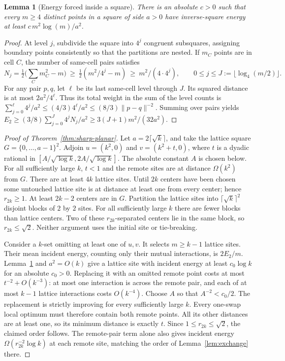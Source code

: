 \documentclass[a4paper,12pt]{article}
\newtheorem{lemma}[theorem]{Lemma}
\numberwithin{equation}{section}
\begin{document}
\begin{lemma}[Energy forced inside a square]\label{lem:square-bulk}
There is an absolute $c>0$ such that every $m\ge4$ distinct points in a square of side
$a>0$ have inverse-square energy at least $c\,m^2\log(m)/a^2$.
\end{lemma}
\begin{proof}
At level $j$, subdivide the square into $4^j$ congruent subsquares, assigning boundary points
consistently so that the partitions are nested. If $m_C$ points are in cell $C$, the number of
same-cell pairs satisfies
\[
 N_j=\tfrac12\bigl(\textstyle\sum_C m_C^2-m\bigr)
 \ \ge\ \tfrac12(m^2/4^j-m)
 \ \ge\ m^2/(4\cdot4^j),\qquad 0\le j\le J:=\lfloor\log_4(m/2)\rfloor .
\]
For any pair $p,q$, let $\ell$ be its last same-cell level through $J$. Its squared distance is
at most $2a^2/4^\ell$. Thus its total weight in the sum of the level counts is
$\sum_{j=0}^{\ell}4^j/a^2\le(4/3)4^\ell/a^2\le(8/3)\|p-q\|^{-2}$. Summing over pairs
yields $E_2\ge(3/8)\sum_{j=0}^J4^jN_j/a^2\ge3(J+1)m^2/(32a^2)$.
\end{proof}

\begin{proof}[Proof of Theorem~\ref{thm:sharp-planar}]
Let $a=2\lceil\sqrt{k}\rceil$, and take the lattice square $G=\{0,\ldots,a-1\}^2$.
Adjoin $u=(k^2,0)$ and $v=(k^2+t,0)$, where $t$ is a dyadic rational in
$[A/\sqrt{\log k},2A/\sqrt{\log k}]$. The absolute constant $A$ is chosen below. For all
sufficiently large $k$, $t<1$ and the remote sites are at distance $\Omega(k^2)$ from $G$.
There are at least $4k$ lattice sites. Until $2k$ centers have been chosen some untouched lattice
site is at distance at least one from every center; hence $r_{2k}\ge1$. At least $2k-2$ centers
are in $G$. Partition the lattice sites into $\lceil\sqrt{k}\rceil^2$ disjoint blocks of
$2$ by $2$ sites. For all sufficiently large $k$ there are fewer blocks than lattice centers.
Two of these $r_{2k}$-separated centers lie in the same block, so $r_{2k}\le\sqrt2$.
Neither argument uses the initial site or tie-breaking.

Consider a $k$-set omitting at least one of $u,v$. It selects $m\ge k-1$ lattice sites.
Their mean incident energy, counting only their mutual interactions, is $2E_2/m$.
Lemma~\ref{lem:square-bulk} and $a^2=O(k)$ give a lattice site with incident
energy at least $c_0\log k$ for an absolute $c_0>0$. Replacing it with an omitted remote
point costs at most $t^{-2}+O(k^{-3})$: at most one interaction is across the remote pair,
and each of at most $k-1$ lattice interactions costs $O(k^{-4})$. Choose $A$ so that
$A^{-2}<c_0/2$. The replacement is strictly improving for every sufficiently large $k$.
Every one-swap local optimum must therefore contain both remote points. All its other
distances are at least one, so its minimum distance is exactly $t$.
Since $1\le r_{2k}\le\sqrt2$, the claimed order follows. The remote-pair term alone also
gives incident energy $\Omega(r_{2k}^{-2}\log k)$ at each remote site, matching the order of
Lemma~\ref{lem:exchange} there.
\end{proof}
\end{document}
